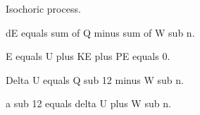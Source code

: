 Isochoric process.  

dE equals sum of Q minus sum of W sub n.  

E equals U plus KE plus PE equals 0.  

Delta U equals Q sub 12 minus W sub n.  

a sub 12 equals delta U plus W sub n.
